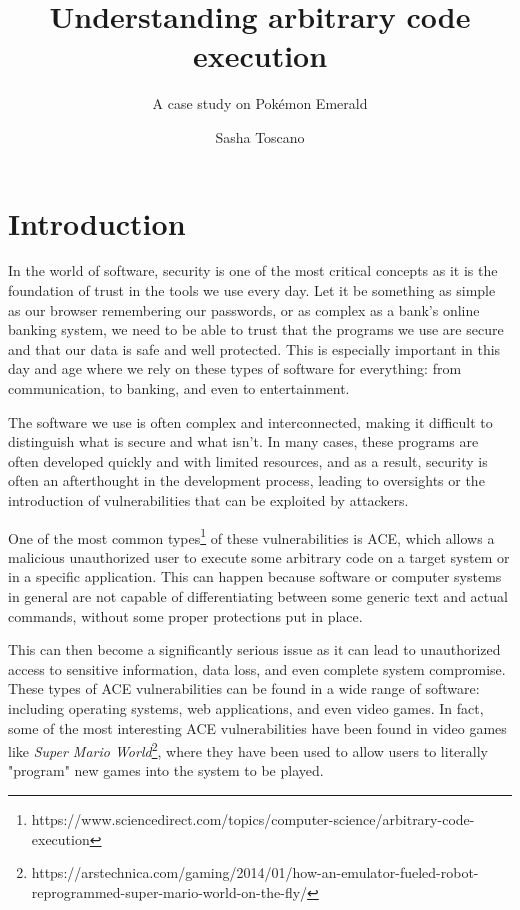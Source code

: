 \documentclass[a4paper]{usiinfbachelorproject}
\author{Sasha Toscano}
\title{\textbf{Understanding arbitrary code
execution}}
\subtitle{A case study on Pokémon Emerald}
\begin{document}
\maketitle
\tableofcontents\newpage

\section{Introduction}
In the world of software, security is one of the most critical concepts as it is the foundation of trust in the tools we use every day. Let it be something as simple as our browser remembering our passwords, or as complex as a bank's online banking system, we need to be able to trust that the programs we use are secure and that our data is safe and well protected. This is especially important in this day and age where we rely on these types of software for everything: from communication, to banking, and even to entertainment.

The software we use is often complex and interconnected, making it difficult to distinguish what is secure and what isn't. In many cases, these programs are often developed quickly and with limited resources, and as a result, security is often an afterthought in the development process, leading to oversights or the introduction of vulnerabilities that can be exploited by attackers.

One of the most common types\footnote{https://www.sciencedirect.com/topics/computer-science/arbitrary-code-execution} of these vulnerabilities is ACE, which allows a malicious unauthorized user to execute some arbitrary code on a target system or in a specific application. This can happen because software or computer systems in general are not capable of differentiating between some generic text and actual commands, without some proper protections put in place.

This can then become a significantly serious issue as it can lead to unauthorized access to sensitive information, data loss, and even complete system compromise. These types of ACE vulnerabilities can be found in a wide range of software: including operating systems, web applications, and even video games. In fact, some of the most interesting ACE vulnerabilities have been found in video games like \textit{Super Mario World}\footnote{https://arstechnica.com/gaming/2014/01/how-an-emulator-fueled-robot-reprogrammed-super-mario-world-on-the-fly/}, where they have been used to allow users to literally "program" new games into the system to be played.
\end{document}
